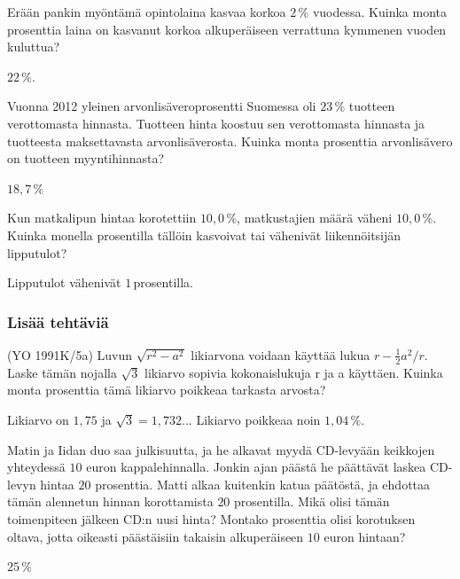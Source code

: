 \begin{tehtavasivu}
\begin{tehtava}
    Erään pankin myöntämä opintolaina kasvaa korkoa $2\,\%$ vuodessa. Kuinka monta prosenttia laina on kasvanut korkoa alkuperäiseen verrattuna kymmenen vuoden kuluttua?
    \begin{vastaus}
        $22\,\%$.
    \end{vastaus}
\end{tehtava}

\begin{tehtava}
    Vuonna 2012 yleinen arvonlisäveroprosentti Suomessa oli $23\,\%$ tuotteen verottomasta hinnasta. Tuotteen hinta koostuu sen verottomasta hinnasta ja tuotteesta maksettavasta arvonlisäverosta. Kuinka monta prosenttia arvonlisävero on tuotteen myyntihinnasta?
    \begin{vastaus}
        $18,7\,\%$
    \end{vastaus}
\end{tehtava}

\begin{tehtava}
    Kun matkalipun hintaa korotettiin $10,0\,\%$, matkustajien määrä väheni $10,0\,\%$. Kuinka monella prosentilla tällöin kasvoivat tai vähenivät liikennöitsijän lipputulot?
    \begin{vastaus}
        Lipputulot vähenivät $1$\,prosentilla.
    \end{vastaus}
\end{tehtava}

\subsubsection*{Lisää tehtäviä}

\begin{tehtava}
    (YO 1991K/5a) Luvun $\sqrt{r^2-a^2}$ likiarvona voidaan käyttää lukua $r-{\frac{1}{2}a^2}/r$. Laske tämän nojalla $\sqrt{3}$ likiarvo sopivia kokonaislukuja r ja a käyttäen. Kuinka monta prosenttia tämä likiarvo poikkeaa tarkasta arvosta?
    \begin{vastaus}
        Likiarvo on $1,75$ ja $\sqrt{3}=1,732...$ Likiarvo poikkeaa noin $1,04\,\%$.
    \end{vastaus}
\end{tehtava}

\begin{tehtava}
    Matin ja Iidan duo saa julkisuutta, ja he alkavat myydä CD-levyään keikkojen yhteydessä $10$ euron kappalehinnalla. Jonkin ajan päästä he päättävät laskea CD-levyn hintaa $20$ prosenttia. Matti alkaa kuitenkin katua päätöstä, ja ehdottaa tämän alennetun hinnan korottamista $20$ prosentilla. Mikä olisi tämän toimenpiteen jälkeen CD:n uusi hinta? Montako prosenttia olisi korotuksen oltava, jotta oikeasti päästäisiin takaisin alkuperäiseen $10$ euron hintaan?
    \begin{vastaus}
        $25\,\%$
    \end{vastaus}
\end{tehtava}



\end{tehtavasivu}
